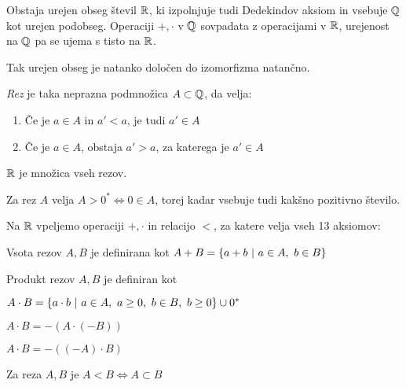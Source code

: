 \documentclass[12pt, a4paper]{article}
\begin{document}
\begin{izrek}
Obstaja urejen obseg števil $\mathbb{R}$, ki izpolnjuje tudi Dedekindov aksiom in vsebuje $\mathbb{Q}$ kot urejen podobseg. Operaciji $+,\cdot$ v $\mathbb{Q}$ sovpadata z operacijami v $\mathbb{R}$, urejenost na $\mathbb{Q}$ pa se ujema s tisto na $\mathbb{R}$.
\end{izrek}

\begin{opomba}
Tak urejen obseg je natanko določen do izomorfizma natančno.
\end{opomba}

\begin{definicija}
\emph{Rez} je taka neprazna podmnožica $A\subset\mathbb{Q}$, da velja:

\begin{enumerate}[label=\roman*)]
\item Če je $a\in A$ in $a'<a$, je tudi $a'\in A$
\item Če je $a\in A$, obstaja $a'>a$, za katerega je $a'\in A$
\end{enumerate}

$\mathbb{R}$ je množica vseh rezov.
\end{definicija}

\begin{opomba}
Za rez $A$ velja $A>0^*\iff 0\in A$, torej kadar vsebuje tudi kakšno pozitivno število.
\end{opomba}

\begin{definicija}
Na $\mathbb{R}$ vpeljemo operaciji $+,\cdot$ in relacijo $<$, za katere velja vseh 13 aksiomov:

\begin{description}[font=\normalfont, align=left, labelwidth=3cm]
\item[$\bullet$ Operacija $+$] Vsota rezov $A,B$ je definirana kot $A+B=\left\{a+b~\middle\vert~a\in A,~b\in B\right\}$
\item[$\bullet$ Operacija $\cdot$] Produkt rezov $A,B$ je definiran kot

\begin{description}[font=\normalfont, align=left, labelwidth=3.5cm]
\item [i) $A,B>0$] $A\cdot B=\left\{a\cdot b~\middle\vert~a\in A,~a\geq 0,~b\in B,~b\geq 0\right\}\cup 0^*$
\item[ii) $A>0,B<0$] $A\cdot B=-(A\cdot(-B))$
\item [iii) $A<0$] $A\cdot B=-((-A)\cdot B)$
\end{description}
\item[$\bullet$ Relacija $<$] Za reza $A,B$ je $A<B\iff A\subset B$
\end{description}
\end{definicija}
\end{document}
